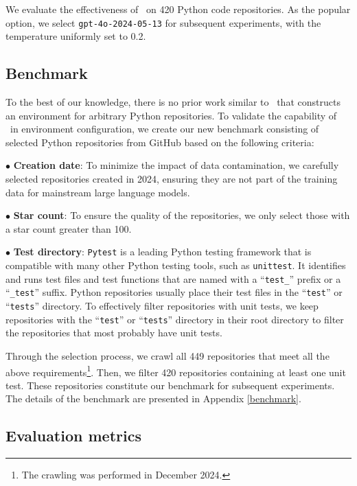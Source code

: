 
We evaluate the effectiveness of \tool~on 420 Python code repositories. As the popular option, we select \texttt{gpt-4o-2024-05-13} for subsequent experiments, with the temperature uniformly set to 0.2.

\subsection{Benchmark}

To the best of our knowledge, there is no prior work similar to \tool~that constructs an environment for arbitrary Python repositories.
To validate the capability of \tool~in environment configuration, we create our new benchmark consisting of selected Python repositories from GitHub based on the following criteria:


$\bullet$ \textbf{Creation date}: To minimize the impact of data contamination, we carefully selected repositories created in 2024, ensuring they are not part of the training data for mainstream large language models.


$\bullet$ \textbf{Star count}: To ensure the quality of the repositories, we only select those with a star count greater than 100.


$\bullet$ \textbf{Test directory}:
\texttt{Pytest} is a leading Python testing framework that is compatible with many other Python testing tools, such as \texttt{unittest}. It identifies and runs test files and test functions that are named with a ``\texttt{test\_}'' prefix or a ``\texttt{\_test}'' suffix. Python repositories usually place their test files in the ``\texttt{test}'' or ``\texttt{tests}'' directory. To effectively filter repositories with unit tests, we keep repositories with the ``\texttt{test}'' or ``\texttt{tests}'' directory in their root directory to filter the repositories that most probably have unit tests.

Through the selection process, we crawl all 449 repositories that meet all the above requirements\footnote{The crawling was performed in December 2024.}. Then, we filter 420 repositories containing at least one unit test. These repositories constitute our benchmark for subsequent experiments. The details of the benchmark are presented in Appendix \ref{benchmark}.


\subsection{Evaluation metrics}


